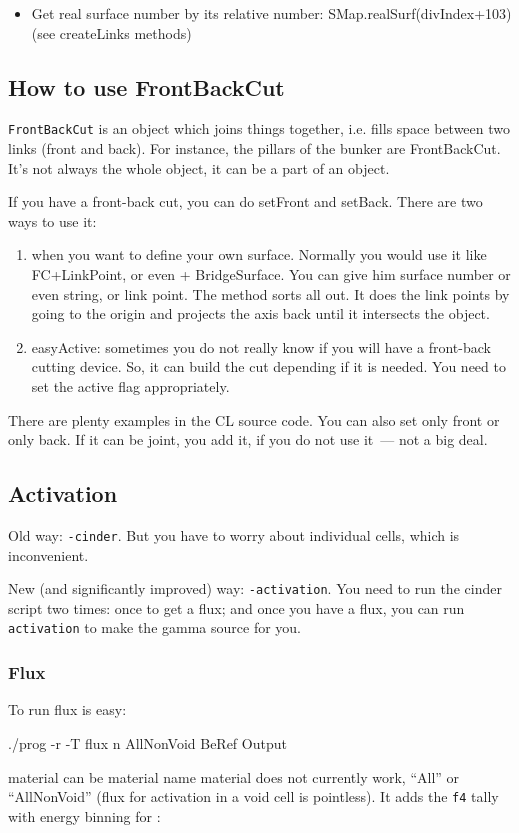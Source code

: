 \begin{itemize}
\item Get real surface number by its relative number: SMap.realSurf(divIndex+103) (see createLinks methods)
\end{itemize}

\subsection{How to use FrontBackCut}
{\tt FrontBackCut} is an object which joins things together, i.e. fills space between two links (front and back).
For instance, the pillars of the bunker are FrontBackCut.
It's not always the whole object, it can be a part of an object.

If you have a front-back cut, you can do setFront and setBack. There are two ways to use it:
\begin{enumerate}
\item when you want to define your own surface. Normally you would use it like FC+LinkPoint, or even + BridgeSurface.
  You can give him surface number or even string, or link point. The method sorts all out.
  It does the link points by going to the origin and projects the axis back until it intersects the object.
\item easyActive: sometimes you do not really know if you will have a front-back cutting device. So, it can build the cut depending if it is needed.
  You need to set the active flag appropriately.
\end{enumerate}
There are plenty examples in the CL source code. You can also set only front or only back.
If it can be joint, you add it, if you do not use it~--- not a big deal.


\subsection{Activation}
Old way: {\tt -cinder}. But you have to worry about individual cells, which is inconvenient.

New (and significantly improved) way: {\tt -activation}.
You need to run the cinder script two times: once to get a flux; and once you have a flux, you can run {\tt activation} to make the gamma source for you.

\subsubsection{Flux}
To run flux is easy:
\begin{bash}
./prog -r -T flux n AllNonVoid BeRef Output
\end{bash}
material can be material name \alert{material does not currently work}, ``All'' or ``AllNonVoid'' (flux for activation in a void cell is pointless).
It adds the {\tt f4} tally with energy binning for \cinder:

